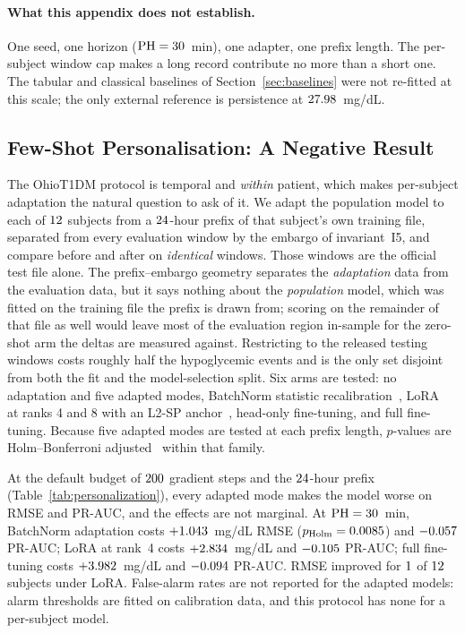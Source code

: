 \paragraph{What this appendix does not establish.} One seed, one horizon
($\mathrm{PH} = 30$~min), one adapter, one prefix length. The per-subject
window cap makes a long record contribute no more than a short one. The tabular
and classical baselines of Section~\ref{sec:baselines} were not re-fitted at this
scale; the only external reference is persistence at
$27.98$~mg/dL.

\subsection{Few-Shot Personalisation: A Negative Result}
\label{sec:personalisation}

The OhioT1DM protocol is temporal and \emph{within} patient, which makes
per-subject adaptation the natural question to ask of it. We adapt the
population model to each of $12$ subjects from a
$24$-hour prefix of that subject's own training file, separated
from every evaluation window by the embargo of invariant~I5, and compare before
and after on \emph{identical} windows. Those windows are the official test file
alone. The prefix--embargo geometry separates the \emph{adaptation} data from the
evaluation data, but it says nothing about the \emph{population} model, which was
fitted on the training file the prefix is drawn from; scoring on the remainder of
that file as well would leave most of the evaluation region in-sample for the
zero-shot arm the deltas are measured against. Restricting to the released
testing windows costs roughly half the hypoglycemic events and is the only set
disjoint from both the fit and the model-selection split. Six arms are tested: no adaptation and five adapted modes,
BatchNorm statistic recalibration~\citep{schneider2020improving}, LoRA~\citep{hu2022lora} at ranks 4 and 8 with
an L2-SP anchor~\citep{xuhong2018explicit}, head-only fine-tuning, and full
fine-tuning. Because five adapted modes are tested at each prefix length, $p$-values are
Holm--Bonferroni adjusted~\citep{holm1979simple} within that family.

At the default budget of $200$ gradient steps and the
$24$-hour prefix (Table~\ref{tab:personalization}), every
adapted mode makes the model worse on RMSE and PR-AUC, and the effects are not
marginal. At $\mathrm{PH} = 30$~min, BatchNorm adaptation costs $+1.043$~mg/dL RMSE
($p_{\text{Holm}} = 0.0085$) and
$-0.057$ PR-AUC; LoRA at rank~4 costs
$+2.834$~mg/dL and $-0.105$ PR-AUC; full
fine-tuning costs $+3.982$~mg/dL and
$-0.094$ PR-AUC. RMSE improved for
$1$ of $12$ subjects under LoRA.
False-alarm rates are not reported for the adapted models: alarm thresholds are
fitted on calibration data, and this protocol has none for a per-subject model.

